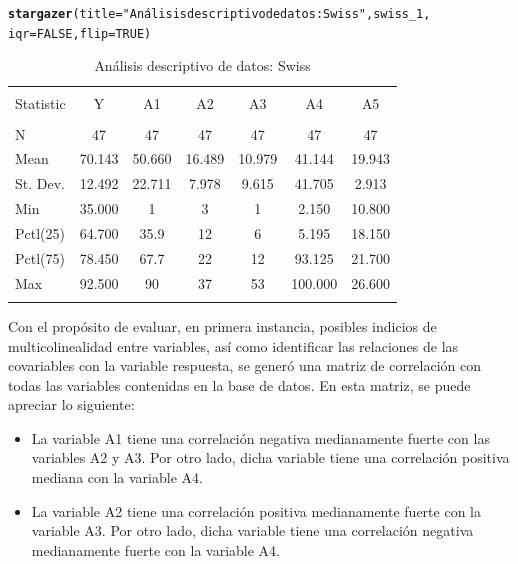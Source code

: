 \documentclass[10pt,a4paper]{article}\usepackage[]{graphicx}\usepackage[]{color}
\makeatletter
\newcommand{\hlnum}[1]{\textcolor[rgb]{0.686,0.059,0.569}{#1}}%
\newcommand{\hlstr}[1]{\textcolor[rgb]{0.192,0.494,0.8}{#1}}%
\newcommand{\hlstd}[1]{\textcolor[rgb]{0.345,0.345,0.345}{#1}}%
\newcommand{\hlkwc}[1]{\textcolor[rgb]{0.333,0.667,0.333}{#1}}%
\newcommand{\hlkwd}[1]{\textcolor[rgb]{0.737,0.353,0.396}{\textbf{#1}}}%
\newenvironment{kframe}{%
 \def\at@end@of@kframe{}%
 \ifinner\ifhmode%
  \def\at@end@of@kframe{\end{minipage}}%
  \begin{minipage}{\columnwidth}%
 \fi\fi%
 \def\FrameCommand##1{\hskip\@totalleftmargin \hskip-\fboxsep
 \colorbox{shadecolor}{##1}\hskip-\fboxsep
     \hskip-\linewidth \hskip-\@totalleftmargin \hskip\columnwidth}%
 \MakeFramed {\advance\hsize-\width
   \@totalleftmargin\z@ \linewidth\hsize
   \@setminipage}}%
 {\par\unskip\endMakeFramed%
 \at@end@of@kframe}
\makeatother
\begin{document}
\begin{kframe}
\begin{alltt}
\hlkwd{stargazer}\hlstd{(}\hlkwc{title} \hlstd{=}\hlstr{"Análisis descriptivo de datos: Swiss"}\hlstd{,swiss_1,}
\hlkwc{iqr}\hlstd{=}\hlnum{FALSE}\hlstd{,}\hlkwc{flip} \hlstd{=} \hlnum{TRUE}\hlstd{)}
\end{alltt}
\end{kframe}
\begin{table}[!htbp] \centering 
  \caption{Análisis descriptivo de datos: Swiss} 
  \label{} 
\begin{tabular}{@{\extracolsep{5pt}}lcccccc} 
\\[-1.8ex]\hline 
\hline \\[-1.8ex] 
Statistic & Y & A1 & A2 & A3 & A4 & A5 \\ 
\hline \\[-1.8ex] 
N & 47 & 47 & 47 & 47 & 47 & 47 \\ 
Mean & 70.143 & 50.660 & 16.489 & 10.979 & 41.144 & 19.943 \\ 
St. Dev. & 12.492 & 22.711 & 7.978 & 9.615 & 41.705 & 2.913 \\ 
Min & 35.000 & 1 & 3 & 1 & 2.150 & 10.800 \\ 
Pctl(25) & 64.700 & 35.9 & 12 & 6 & 5.195 & 18.150 \\ 
Pctl(75) & 78.450 & 67.7 & 22 & 12 & 93.125 & 21.700 \\ 
Max & 92.500 & 90 & 37 & 53 & 100.000 & 26.600 \\ 
\hline \\[-1.8ex] 
\end{tabular} 
\end{table} 


Con el propósito de evaluar, en primera instancia, posibles indicios de multicolinealidad entre variables, así como identificar las relaciones de las covariables con la variable respuesta, se generó una matriz de correlación con todas las variables contenidas en la base de datos. En esta matriz, se puede apreciar lo siguiente:

\begin{itemize}
	\item La variable A1 tiene una correlación negativa medianamente fuerte con las variables A2 y A3. Por otro lado, dicha variable tiene una correlación positiva mediana con la variable A4.
	\item La variable A2 tiene una correlación positiva medianamente fuerte con la variable A3. Por otro lado, dicha variable tiene una correlación negativa medianamente fuerte con la variable A4.
\end{itemize}
\end{document}
